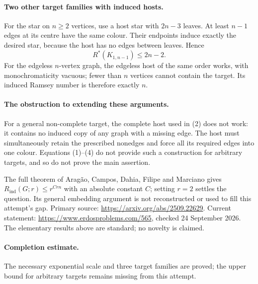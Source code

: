 \paragraph{Two other target families with induced hosts.}
For the star on \(n\geq2\) vertices, use a host star with
\(2n-3\) leaves. At least \(n-1\) edges at its centre have the
same colour. Their endpoints induce exactly the desired star,
because the host has no edges between leaves. Hence
\[
 R^*(K_{1,n-1})\leq2n-2. \tag{4}
\]
For the edgeless \(n\)-vertex graph, the edgeless host of the same
order works, with monochromaticity vacuous; fewer than \(n\)
vertices cannot contain the target. Its induced Ramsey number is
therefore exactly \(n\).

\paragraph{The obstruction to extending these arguments.}
For a general non-complete target, the complete host used in (2)
does not work: it contains no induced copy of any graph with a
missing edge. The host must simultaneously retain the prescribed
nonedges and force all its required edges into one colour.
Equations (1)--(4) do not provide such a construction for arbitrary
targets, and so do not prove the main assertion.

The full theorem of Arag\~ao, Campos, Dahia, Filipe and Marciano
gives \(R_{\mathrm{ind}}(G;r)\leq r^{Crn}\) with an absolute
constant \(C\); setting \(r=2\) settles the question.
Its general embedding argument is not reconstructed or used to
fill this attempt's gap. Primary source:
\url{https://arxiv.org/abs/2509.22629}.
Current statement: \url{https://www.erdosproblems.com/565},
checked 24 September 2026. The elementary results above are standard;
no novelty is claimed.

\paragraph{Completion estimate.}
The necessary exponential scale and three target families are proved;
the upper bound for arbitrary targets remains missing from this attempt.
